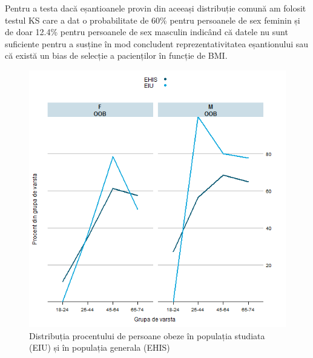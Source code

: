 \documentclass[11pt,draft]{article}
\begin{document}
  Pentru a testa dacă eșantioanele provin din aceeași distribuție comună am folosit testul \ac{KS} care a dat o probabilitate de 60\% pentru persoanele de sex feminin și de doar 12.4\% pentru persoanele de sex masculin indicând că datele nu sunt suficiente pentru a susține în mod concludent reprezentativitatea eșantionului sau că există un bias de selecție a pacienților în funcție de \ac{BMI}.
  \begin{figure}[H]
    \centering
    \includegraphics[width=0.8\linewidth]{incoBMIvsEHIS-OOB}
    \caption{Distribuția procentului de persoane obeze în populația studiata (EIU) și în populația generala (EHIS) }
    \label{fig:incoBMIvsEHIS-OOB}
  \end{figure}
\end{document}
